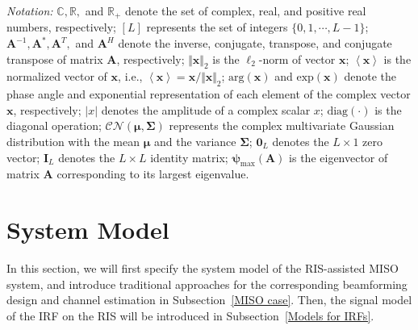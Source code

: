 \documentclass[12pt,draftclsnofoot,journal,onecolumn]{IEEEtran}
\theoremstyle{nonumberplain}
\begin{document}
\textit{Notation:} $\mathbb C, \mathbb R,$ and $\mathbb R_+$ denote the set of
complex, real, and positive real numbers, respectively;
$[L]$ represents the set of integers $\{0,1,\cdots,L-1\}$;
$\bm A^{-1}, \bm A^*,\bm A^T,$ and $\bm A^H$ denote the inverse, conjugate, transpose, and conjugate transpose of matrix $\bm A$, respectively; 
$\Vert\bm x\Vert_{2}$ is the $\ell_{2}$-norm of vector $\bm x$; 
$\left\langle\bm x\right\rangle$ is the normalized vector of $\bm x$, i.e., $\left\langle\bm x\right\rangle=\bm x/\Vert\bm x\Vert_{2}$;
$\text{arg}(\bm x)$ and $\text{exp}(\bm x)$ denote the phase angle and exponential representation of each element of the complex vector $\bm x$, respectively;
$\vert x\vert$ denotes the amplitude
of a complex scalar $x$; 
$\text{diag}(\cdot )$ is the diagonal operation;
$\mathcal{CN}\left(\bm \mu, \bm \Sigma \right)$ represents the complex multivariate Gaussian distribution with the mean $\bm \mu$ and the variance $\bm \Sigma$;
$\bm 0_{L}$ denotes the $L\times 1$ zero vector;
$\bm I_{L}$ denotes the $L\times L$ identity matrix;
$\bm \psi_{\text{max}}(\bm A)$ is the eigenvector of matrix
$\bm A$ corresponding to its largest eigenvalue.


\section{System Model}  \label{System Model}
    In this section, we will first specify the system model of the RIS-assisted \ac{MISO} system, and introduce traditional approaches for the corresponding beamforming design and channel estimation in Subsection~\ref{MISO case}. Then, the signal model of the \ac{IRF} on the RIS will be introduced in Subsection~\ref{Models for IRFs}.
\end{document}
